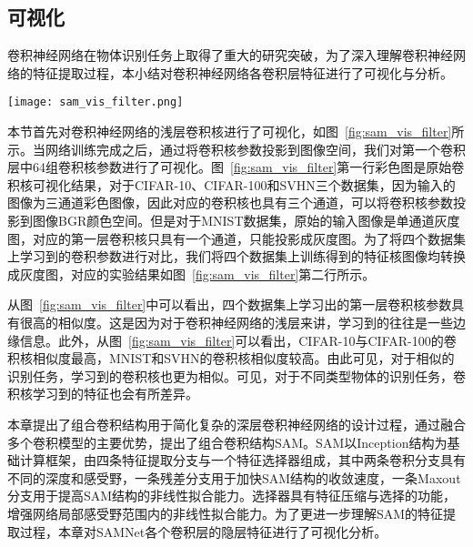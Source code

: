 \subsection{可视化}
\label{sec:sam:vis}

卷积神经网络在物体识别任务上取得了重大的研究突破，为了深入理解卷积神经网络的特征提取过程，本小结对卷积神经网络各卷积层特征进行了可视化与分析。

\begin{figure*}[h]
\centering
\texttt{[image: sam\_vis\_filter.png]}
\caption{第一层卷积核参数可视化。同一个神经网络模型SAMNet，在四个不同的数据集CIFAR-10、CIFAR-100、MNIST和SVHN上训练出的网络模型，第一个卷积层中64组卷积核参数可视化结果。将卷积核参数投影到图像像素空间，对于CIFAR-10、CIFAR-100和SVHN对应投影图像是三维彩色空间，对于MNIST因为输入只有单通道数据，投影后的卷积核可视化图像为灰度图。为了便于四个数据集卷积参数的对比，我们将所有图像转换为灰度图，如图中第二行所示，MNIST参数可视化结果保留不变。因卷积核大小仅仅为 $3\times3$，可视化图像大小也是 $3\times3$ 像素大小的图像，因此视觉效果较为模糊。}
\label{fig:sam_vis_filter}
\end{figure*}

本节首先对卷积神经网络的浅层卷积核进行了可视化，如图~\ref{fig:sam_vis_filter}所示。当网络训练完成之后，通过将卷积核参数投影到图像空间，我们对第一个卷积层中64组卷积核参数进行了可视化。图~\ref{fig:sam_vis_filter}第一行彩色图是原始卷积核可视化结果，对于CIFAR-10、CIFAR-100和SVHN三个数据集，因为输入的图像为三通道彩色图像，因此对应的卷积核也具有三个通道，可以将卷积核参数投影到图像BGR颜色空间。但是对于MNIST数据集，原始的输入图像是单通道灰度图，对应的第一层卷积核只具有一个通道，只能投影成灰度图。为了将四个数据集上学习到的卷积参数进行对比，我们将四个数据集上训练得到的特征核图像均转换成灰度图，对应的实验结果如图~\ref{fig:sam_vis_filter}第二行所示。

从图~\ref{fig:sam_vis_filter}中可以看出，四个数据集上学习出的第一层卷积核参数具有很高的相似度。这是因为对于卷积神经网络的浅层来讲，学习到的往往是一些边缘信息。此外，从图~\ref{fig:sam_vis_filter}可以看出，CIFAR-10与CIFAR-100的卷积核相似度最高，MNIST和SVHN的卷积核相似度较高。由此可见，对于相似的识别任务，学习到的卷积核也更为相似。可见，对于不同类型物体的识别任务，卷积核学习到的特征也会有所差异。

本章提出了组合卷积结构用于简化复杂的深层卷积神经网络的设计过程，通过融合多个卷积模型的主要优势，提出了组合卷积结构SAM。SAM以Inception结构为基础计算框架，由四条特征提取分支与一个特征选择器组成，其中两条卷积分支具有不同的深度和感受野，一条残差分支用于加快SAM结构的收敛速度，一条Maxout分支用于提高SAM结构的非线性拟合能力。选择器具有特征压缩与选择的功能，增强网络局部感受野范围内的非线性拟合能力。为了更进一步理解SAM的特征提取过程，本章对SAMNet各个卷积层的隐层特征进行了可视化分析。


